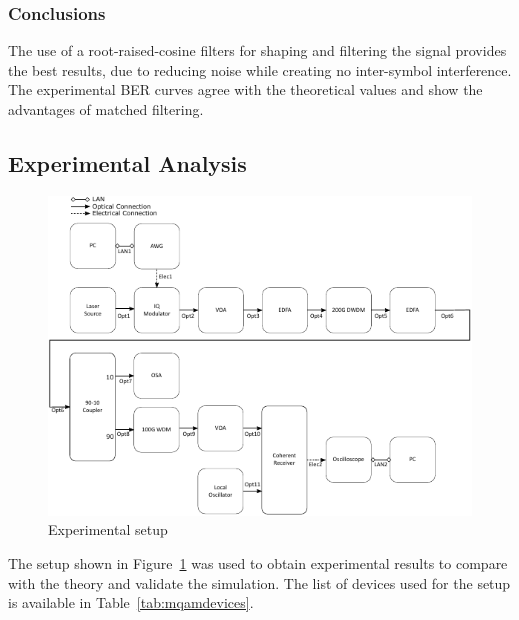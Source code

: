 \subsubsection*{Conclusions}
The use of a root-raised-cosine filters for shaping and filtering the signal provides the best results, due to reducing noise while creating no inter-symbol interference. The experimental BER curves agree with the theoretical values and show the advantages of matched filtering.

\subsection*{Experimental Analysis}
\begin{figure}[H]
	\centering
	\includegraphics[width=\textwidth]{./sdf/m_qam_system/figures/mqamExperimental20180321.pdf}
	\caption{Experimental setup}
	\label{fig:experimental_mqam_setup}
\end{figure}

The setup shown in Figure~\ref{fig:experimental_mqam_setup} was used to obtain experimental results to compare with the theory and validate the simulation. The list of devices used for the setup is available in Table~\ref{tab:mqamdevices}.


